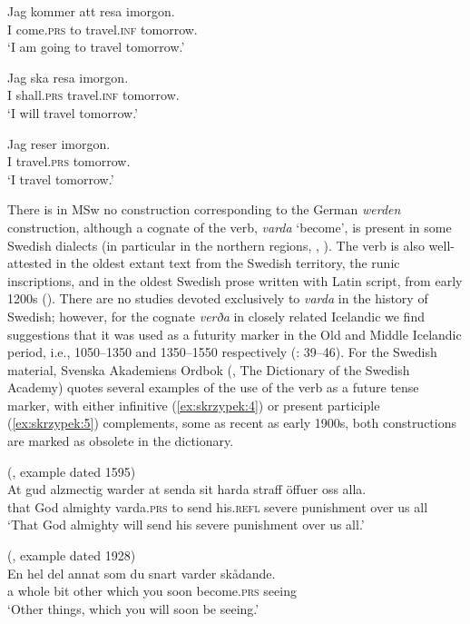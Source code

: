 \documentclass[output=paper,colorlinks,citecolor=brown]{langscibook}
\begin{document}
\ea \label{ex:skrzypek:1}
    \gll Jag kommer att resa imorgon.\\
    I come.\textsc{prs} to travel.\textsc{inf} tomorrow.\\
    \glt ‘I am going to travel tomorrow.’
\z

\ea \label{ex:skrzypek:2}
    \gll Jag ska resa imorgon.\\
    I shall.\textsc{prs} travel.\textsc{inf} tomorrow.\\
    \glt ‘I will travel tomorrow.’
\z

\ea \label{ex:skrzypek:3}
    \gll Jag reser imorgon.\\
    I travel.\textsc{prs} tomorrow.\\
    \glt ‘I travel tomorrow.’
\z

There is in MSw no construction corresponding to the German \textit{werden} construction, although a cognate of the verb, \textit{varda} ‘become’, is present in some Swedish dialects (in particular in the northern regions, \citet{Eklund2010}, \citet{Loenheim2013}). The verb is also well-attested in the oldest extant text from the Swedish territory, the runic inscriptions, and in the oldest Swedish prose written with Latin script, from early 1200s (\cite{Skrzypek2020}). There are no studies devoted exclusively to \textit{varda} in the history of Swedish; however, for the cognate \textit{verða} in closely related Icelandic we find suggestions that it was used as a futurity marker in the Old and Middle Icelandic period, i.e., 1050--1350 and 1350--1550 respectively (\cite{Halbe1963}: 39--46). For the Swedish material, Svenska Akademiens Ordbok (\citeauthor{SAOB}, The Dictionary of the Swedish Academy) quotes several examples of the use of the verb as a future tense marker, with either infinitive (\ref{ex:skrzypek:4}) or present participle (\ref{ex:skrzypek:5}) complements, some as recent as early 1900s, both constructions are marked as obsolete in the dictionary.

\ea \label{ex:skrzypek:4}
    (\citeauthor{SAOB}, example dated 1595)\\
    \gll At gud alzmectig warder at senda sit harda straff öffuer oss alla.\\
    that God almighty varda\textsc{.prs} to send his.\textsc{refl} severe punishment over us all\\
    \glt ‘That God almighty will send his severe punishment over us all.’
\z

\ea \label{ex:skrzypek:5}
    (\citeauthor{SAOB}, example dated 1928)\\
    \gll En hel del annat som du snart varder skådande.\\
    a whole bit other which you soon become.\textsc{prs} seeing\\
    \glt ‘Other things, which you will soon be seeing.’
\z
\end{document}
